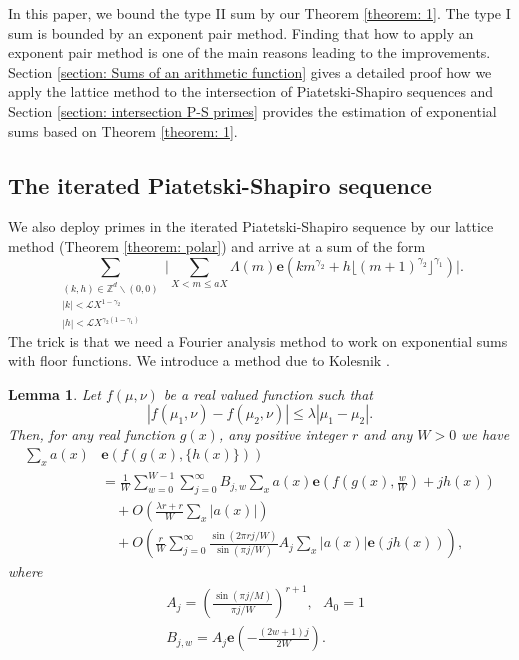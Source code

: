 \documentclass[12pt, reqno, twoside, letterpaper]{amsart}
\numberwithin{equation}{section}
\newcommand{\e}{\ensuremath{\mathbf{e}}}
\newcommand{\cL}{\ensuremath{\mathcal{L}}}
\newcommand{\ZZ}{\ensuremath{\mathbb{Z}}}
\theoremstyle{customthm}
\newtheorem{lemma}[X]{Lemma}
\theoremstyle{customrem}
\begin{document}
In this paper, we bound the type II sum by our Theorem \ref{theorem: 1}. The type I sum is bounded by an exponent pair method. Finding that how to apply an exponent pair method is one of the main reasons leading to the improvements. Section \ref{section: Sums of an arithmetic function} gives a detailed proof how we apply the lattice method to the intersection of Piatetski-Shapiro sequences and Section \ref{section: intersection P-S primes} provides the estimation of exponential sums based on Theorem \ref{theorem: 1}.

\subsection{The iterated Piatetski-Shapiro sequence}

We also deploy primes in the iterated Piatetski-Shapiro sequence by our lattice method (Theorem \ref{theorem: polar}) and arrive at a sum of the form
$$
\sum_{\substack{(k,h) \in \ZZ^d \backslash (0,0) \\ |k|<\cL X^{1-\gamma_2} \\ |h|<\cL X^{\gamma_2(1-\gamma_1)}}} \Bigg| \sum_{X < m \leqslant aX}\Lambda(m) \e (km^{\gamma_2} + h\lfloor(m+1)^{\gamma_2}\rfloor^{\gamma_1}) \Bigg|.
$$
The trick is that we need a Fourier analysis method to work on exponential sums with floor functions. We introduce a method due to Kolesnik \cite[Lemma 1]{Kolesnik2003}.

\begin{lemma}\label{lemma: Kolesnik}
	Let $f(\mu,\nu)$ be a real valued function such that
	$$
	|f(\mu_1,\nu)-f(\mu_2,\nu)|\leqslant \lambda |\mu_1-\mu_2|.
	$$
	Then, for any real function $g(x)$, any positive integer $r$ and any $W>0$
	we have
	\begin{align*}
		\sum_{x}a(x)&\mathbf{e}\left(f(g(x),\{h(x)\})\right)\\
		&=\frac{1}{W}\sum_{w=0}^{W-1}\sum_{j=0}^{\infty}B_{j,w}\sum_{x}a(x)
		\mathbf{e}\left(f\left(g(x),\frac{w}{W}\right)+jh(x)\right)\\
		&\quad+O\left(\frac{\lambda r+r}{W}\sum_{x}|a(x)|\right)\\
		&\quad+O\left(\frac{r}{W}\sum_{j=0}^{\infty}\frac{\sin(2\pi rj/W)}{\sin(\pi j/W)}
		A_j\sum_{x}|a(x)|\mathbf{e}(jh(x))\right),
	\end{align*}
	where
	\begin{align*}
		&A_j=\left(\frac{\sin(\pi j/M)}{\pi j/W}\right)^{r+1},\ \ \ A_0=1\\
		&B_{j,w}=A_j\mathbf{e}\left(-\frac{(2w+1)j}{2W}\right).
	\end{align*}
\end{lemma}
\end{document}
